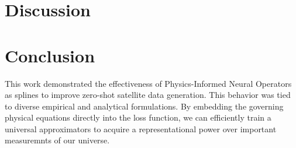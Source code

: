 \documentclass[12pt]{article}
\begin{document}
\section{Discussion}


\section{Conclusion}
This work demonstrated the effectiveness of Physics-Informed Neural Operators as splines to improve zero-shot satellite data generation. This behavior was tied to diverse empirical and analytical formulations. By embedding the governing physical equations directly into the loss function, we can efficiently train a universal approximators to acquire a representational power over important measuremnts of our universe.




\end{document}
